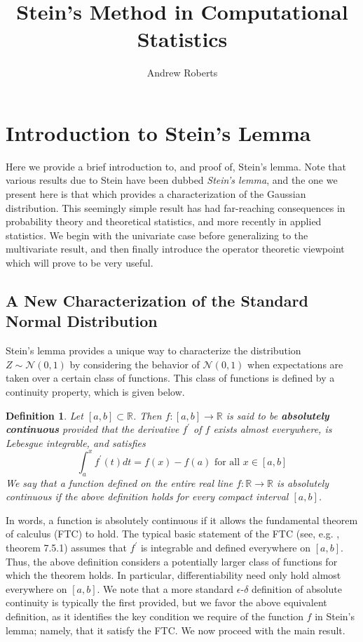 \documentclass[12pt]{article}
\title{Stein's Method in Computational Statistics}
\author{Andrew Roberts}
\newcommand{\R}{\mathbb{R}}
\newcommand{\Gaussian}{\mathcal{N}}
\newtheorem{definition}{Definition}
\begin{document}
\maketitle
\tableofcontents
\newpage

\section{Introduction to Stein's Lemma}
Here we provide a brief introduction to, and proof of, Stein's lemma. Note that various results due to Stein have been dubbed \textit{Stein's lemma}, and the one we present here is that which provides a 
characterization of the Gaussian distribution. This seemingly simple result has had far-reaching consequences in probability theory and theoretical statistics, and more recently in applied statistics. We begin 
with the univariate case before generalizing to the multivariate result, and then finally introduce the operator theoretic viewpoint which will prove to be very useful. 

\subsection{A New Characterization of the Standard Normal Distribution}
Stein's lemma provides a unique way to characterize the distribution $Z \sim \Gaussian(0, 1)$ by considering the behavior of $\Gaussian(0, 1)$ when expectations are taken over 
a certain class of functions. This class of functions is defined by a continuity property, which is given below. 

\begin{definition}
Let $[a, b] \subset \R$. Then $f: [a, b] \to \R$ is said to be \textbf{absolutely continuous} provided that the derivative $f^\prime$ of $f$ exists almost everywhere, is Lebesgue integrable, and satisfies 
\[
\int_{a}^{x} f^\prime(t) dt = f(x) - f(a) \text{ for all } x \in [a, b]
\]
We say that a function defined on the entire real line $f: \R \to \R$ is absolutely continuous if the above definition holds for every compact interval $[a, b]$. 
\end{definition}
In words, a function is absolutely continuous if it allows the fundamental theorem of calculus (FTC) to hold. The typical basic statement of the FTC
(see, e.g. \cite{Abbott}, theorem 7.5.1) assumes that $f^\prime$ is integrable and defined everywhere on $[a, b]$. Thus, the above definition considers a potentially larger class of functions 
for which the theorem holds. In particular, differentiability need only hold almost everywhere on $[a, b]$. We note that a more standard $\epsilon$-$\delta$ definition of absolute continuity is 
typically the first provided, but we favor the above equivalent definition, as it identifies the key condition we require of the function $f$ in Stein's lemma; namely, that it satisfy the FTC. 
We now proceed with the main result. 
\end{document}
